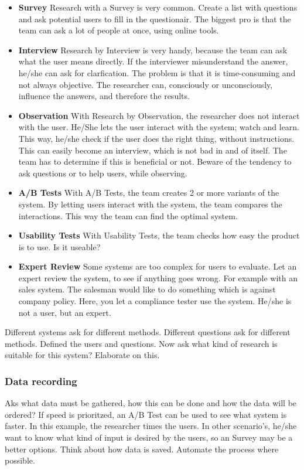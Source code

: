 \documentclass[10pt]{report}
\begin{document}
\begin{itemize}
	\item \textbf{Survey} Research with a Survey is very common. Create a list with questions and ask potential users to fill in the questionair. The biggest pro is that the team can ask a lot of people at once, using online tools.
	\item \textbf{Interview} Research by Interview is very handy, because the team can ask what the user means directly. If the interviewer misunderstand the answer, he/she can ask for clarfication. The problem is that it is time-consuming and not always objective. The researcher can, consciously or unconsciously, influence the answers, and therefore the results.
	\item \textbf{Observation} With Research by Observation, the researcher does not interact with the user. He/She lets the user interact with the system; watch and learn. This way, he/she check if the user does the right thing, without instructions. This can easily become an interview, which is not bad in and of itself. The team has to determine if this is beneficial or not. Beware of the tendency to ask questions or to help users, while observing.
	\item \textbf{A/B Tests} With A/B Tests, the team creates 2 or more variants of the system. By letting users interact with the system, the team compares the interactions. This way the team can find the optimal system.
	\item \textbf{Usability Tests} With Usability Tests, the team checks how easy the product is to use. Is it useable?
	\item \textbf{Expert Review} Some systems are too complex for users to evaluate. Let an expert review the system, to see if anything goes wrong. For example with an sales system. The salesman would like to do something which is against company policy. Here, you let a compliance tester use the system. He/she is not a user, but an expert. 
\end{itemize}

Different systems ask for different methods. Different questions ask for different methods. Defined the users and questions. Now ask what kind of research is suitable for this system? Elaborate on this.

\subsubsection{Data recording}
Aks what data must be gathered, how this can be done and how the data will be ordered? If speed is prioritzed, an A/B Test can be used to see what system is faster. In this example, the researcher times the users. In other scenario's, he/she want to know what kind of input is desired by the users, so an Survey may be a better options. Think about how data is saved. Automate the process where possible.
\end{document}

